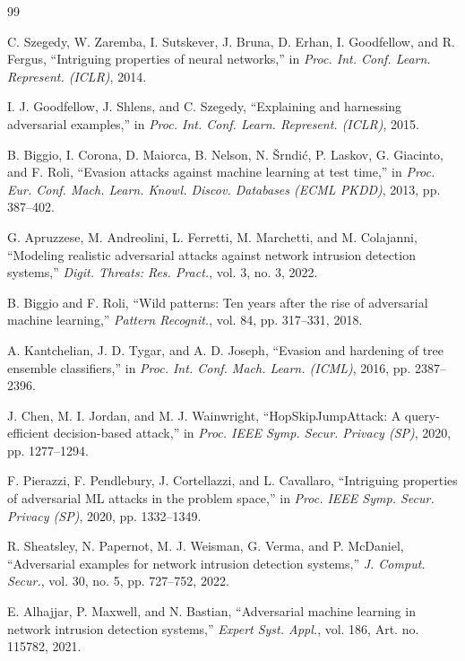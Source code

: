 \documentclass[conference]{IEEEtran}
\begin{document}
\begin{thebibliography}{99}

C. Szegedy, W. Zaremba, I. Sutskever, J. Bruna, D. Erhan, I. Goodfellow, and R. Fergus, ``Intriguing properties of neural networks,'' in \emph{Proc. Int. Conf. Learn. Represent. (ICLR)}, 2014.

I. J. Goodfellow, J. Shlens, and C. Szegedy, ``Explaining and harnessing adversarial examples,'' in \emph{Proc. Int. Conf. Learn. Represent. (ICLR)}, 2015.

B. Biggio, I. Corona, D. Maiorca, B. Nelson, N. Šrndić, P. Laskov, G. Giacinto, and F. Roli, ``Evasion attacks against machine learning at test time,'' in \emph{Proc. Eur. Conf. Mach. Learn. Knowl. Discov. Databases (ECML PKDD)}, 2013, pp. 387--402.

G. Apruzzese, M. Andreolini, L. Ferretti, M. Marchetti, and M. Colajanni, ``Modeling realistic adversarial attacks against network intrusion detection systems,'' \emph{Digit. Threats: Res. Pract.}, vol. 3, no. 3, 2022.

B. Biggio and F. Roli, ``Wild patterns: Ten years after the rise of adversarial machine learning,'' \emph{Pattern Recognit.}, vol. 84, pp. 317--331, 2018.

A. Kantchelian, J. D. Tygar, and A. D. Joseph, ``Evasion and hardening of tree ensemble classifiers,'' in \emph{Proc. Int. Conf. Mach. Learn. (ICML)}, 2016, pp. 2387--2396.

J. Chen, M. I. Jordan, and M. J. Wainwright, ``HopSkipJumpAttack: A query-efficient decision-based attack,'' in \emph{Proc. IEEE Symp. Secur. Privacy (SP)}, 2020, pp. 1277--1294.

F. Pierazzi, F. Pendlebury, J. Cortellazzi, and L. Cavallaro, ``Intriguing properties of adversarial ML attacks in the problem space,'' in \emph{Proc. IEEE Symp. Secur. Privacy (SP)}, 2020, pp. 1332--1349.

R. Sheatsley, N. Papernot, M. J. Weisman, G. Verma, and P. McDaniel, ``Adversarial examples for network intrusion detection systems,'' \emph{J. Comput. Secur.}, vol. 30, no. 5, pp. 727--752, 2022.

E. Alhajjar, P. Maxwell, and N. Bastian, ``Adversarial machine learning in network intrusion detection systems,'' \emph{Expert Syst. Appl.}, vol. 186, Art. no. 115782, 2021.


\end{thebibliography}
\end{document}
